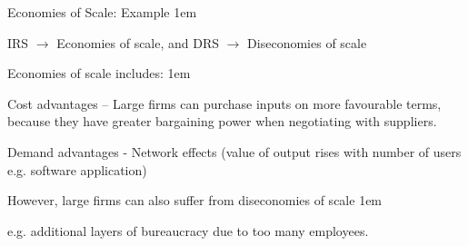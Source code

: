 \documentclass[11pt,aspectratio=43,usenames,dvipsnames]{beamer}
\let\olditemize=\itemize
\let\endolditemize=\enditemize
\renewenvironment{itemize}{\olditemize \itemsep1em}{\endolditemize}
\let\oldenumerate=\enumerate
\let\endoldenumerate=\endenumerate
\renewenvironment{enumerate}{\oldenumerate \itemsep1em}{ \endoldenumerate}
\theoremstyle{definition}
\begin{document}
\begin{frame}{Economies of Scale: Example}
\label{slide:Economies_of_Scale__Example}
    \begin{itemize}
        \item IRS $ \rightarrow  $ Economies of scale, and DRS $ \rightarrow  $ Diseconomies of scale
        \item Economies of scale includes:
        \begin{enumerate}
            \item Cost advantages – Large firms can purchase inputs on more favourable terms, because they have greater bargaining power when negotiating with suppliers.
            \item Demand advantages - Network effects (value of output rises with number of users e.g. software application)
        \end{enumerate}
        \item However, large firms can also suffer from diseconomies of scale
        \begin{itemize}
            \item e.g. additional layers of bureaucracy due to too many employees.
        \end{itemize}
    \end{itemize}
\end{frame}
\end{document}
